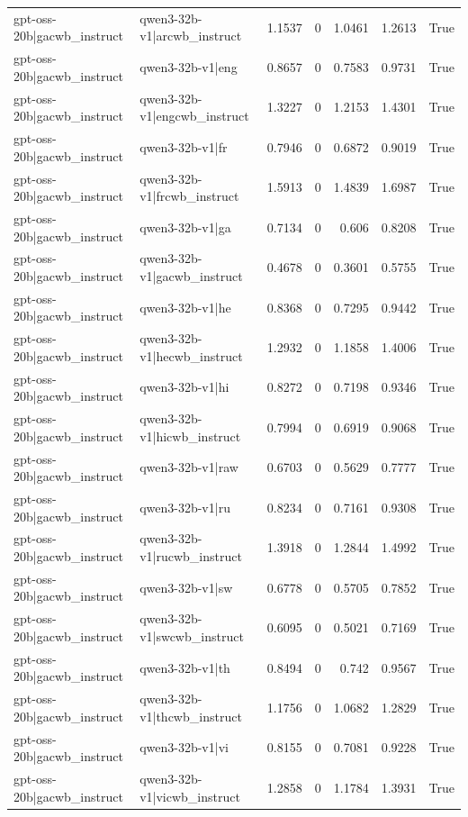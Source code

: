 \begin{table}
\begin{tabular}{l l r r r r l}
gpt-oss-20b|gacwb_instruct & qwen3-32b-v1|arcwb_instruct & 1.1537 & 0 & 1.0461 & 1.2613 & True \\
gpt-oss-20b|gacwb_instruct & qwen3-32b-v1|eng & 0.8657 & 0 & 0.7583 & 0.9731 & True \\
gpt-oss-20b|gacwb_instruct & qwen3-32b-v1|engcwb_instruct & 1.3227 & 0 & 1.2153 & 1.4301 & True \\
gpt-oss-20b|gacwb_instruct & qwen3-32b-v1|fr & 0.7946 & 0 & 0.6872 & 0.9019 & True \\
gpt-oss-20b|gacwb_instruct & qwen3-32b-v1|frcwb_instruct & 1.5913 & 0 & 1.4839 & 1.6987 & True \\
gpt-oss-20b|gacwb_instruct & qwen3-32b-v1|ga & 0.7134 & 0 & 0.606 & 0.8208 & True \\
gpt-oss-20b|gacwb_instruct & qwen3-32b-v1|gacwb_instruct & 0.4678 & 0 & 0.3601 & 0.5755 & True \\
gpt-oss-20b|gacwb_instruct & qwen3-32b-v1|he & 0.8368 & 0 & 0.7295 & 0.9442 & True \\
gpt-oss-20b|gacwb_instruct & qwen3-32b-v1|hecwb_instruct & 1.2932 & 0 & 1.1858 & 1.4006 & True \\
gpt-oss-20b|gacwb_instruct & qwen3-32b-v1|hi & 0.8272 & 0 & 0.7198 & 0.9346 & True \\
gpt-oss-20b|gacwb_instruct & qwen3-32b-v1|hicwb_instruct & 0.7994 & 0 & 0.6919 & 0.9068 & True \\
gpt-oss-20b|gacwb_instruct & qwen3-32b-v1|raw & 0.6703 & 0 & 0.5629 & 0.7777 & True \\
gpt-oss-20b|gacwb_instruct & qwen3-32b-v1|ru & 0.8234 & 0 & 0.7161 & 0.9308 & True \\
gpt-oss-20b|gacwb_instruct & qwen3-32b-v1|rucwb_instruct & 1.3918 & 0 & 1.2844 & 1.4992 & True \\
gpt-oss-20b|gacwb_instruct & qwen3-32b-v1|sw & 0.6778 & 0 & 0.5705 & 0.7852 & True \\
gpt-oss-20b|gacwb_instruct & qwen3-32b-v1|swcwb_instruct & 0.6095 & 0 & 0.5021 & 0.7169 & True \\
gpt-oss-20b|gacwb_instruct & qwen3-32b-v1|th & 0.8494 & 0 & 0.742 & 0.9567 & True \\
gpt-oss-20b|gacwb_instruct & qwen3-32b-v1|thcwb_instruct & 1.1756 & 0 & 1.0682 & 1.2829 & True \\
gpt-oss-20b|gacwb_instruct & qwen3-32b-v1|vi & 0.8155 & 0 & 0.7081 & 0.9228 & True \\
gpt-oss-20b|gacwb_instruct & qwen3-32b-v1|vicwb_instruct & 1.2858 & 0 & 1.1784 & 1.3931 & True \\

\end{tabular}
\end{table}
